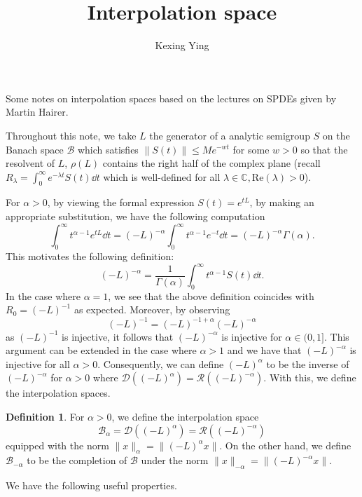 \documentclass[]{article}
\title{Interpolation space}
\author{Kexing Ying}
\theoremstyle{definition}
\theoremstyle{definition}
\newtheorem*{definition}{Definition}
\begin{document}
\maketitle

Some notes on interpolation spaces based on the lectures on SPDEs given by Martin Hairer.

Throughout this note, we take \(L\) the generator of a analytic semigroup \(S\) on the Banach space \(\mathcal{B}\) which satisfies 
\(\|S(t)\| \le M e^{-w t}\) for some \(w > 0\) so that the resolvent of \(L\), \(\rho(L)\) contains 
the right half of the complex plane (recall \(R_\lambda = \int_0^\infty e^{-\lambda t} S(t) \dd{t}\) 
which is well-defined for all \(\lambda \in \mathbb{C}, \text{Re}(\lambda) > 0\)). 

For \(\alpha > 0\), by viewing the formal expression \(S(t) = e^{tL}\), by making an appropriate substitution, we have 
the following computation
\[\int_0^\infty t^{\alpha - 1} e^{tL} \dd t = (-L)^{-\alpha} \int_0^\infty t^{\alpha - 1} e^{-t} \dd t = (-L)^{-\alpha} \Gamma(\alpha).\]
This motivates the following definition: 
\[(-L)^{-\alpha} = \frac{1}{\Gamma(\alpha)} \int_0^\infty t^{\alpha - 1} S(t) \dd t.\]
In the case where \(\alpha = 1\), we see that the above definition coincides with \(R_0 = (-L)^{-1}\) 
as expected. Moreover, by observing 
\[(-L)^{-1} = (-L)^{-1 + \alpha} (-L)^{-\alpha}\]
as \((-L)^{-1}\) is injective, it follows that \((-L)^{-\alpha}\) is injective for \(\alpha \in (0, 1]\).
This argument can be extended in the case where \(\alpha > 1\) and we have that \((-L)^{-\alpha}\) is
injective for all \(\alpha > 0\). Consequently, we can define \((-L)^\alpha\) to be the 
inverse of \((-L)^{-\alpha}\) for \(\alpha > 0\) where \(\mathcal{D}((-L)^\alpha) = \mathcal{R}((-L)^{-\alpha})\).
With this, we define the interpolation spaces.

\begin{definition}
  For \(\alpha > 0\), we define the interpolation space 
  \[\mathcal{B}_\alpha = \mathcal{D}((-L)^\alpha) = \mathcal{R}((-L)^{-\alpha})\]
  equipped with the norm \(\|x\|_\alpha = \|(-L)^\alpha x\|\). On the other hand, we define \(\mathcal{B}_{-\alpha}\) 
  to be the completion of \(\mathcal{B}\) under the norm \(\|x\|_{-\alpha} = \|(-L)^{-\alpha} x\|\).
\end{definition}

We have the following useful properties.
\end{document}
